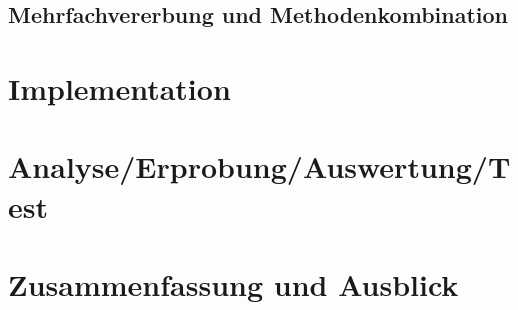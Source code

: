 \section{Mehrfachvererbung und Methodenkombination}

\chapter{Implementation}  %
\label{implementation}

\chapter{Analyse/Erprobung/Auswertung/Test}

\chapter{Zusammenfassung und Ausblick}

 




